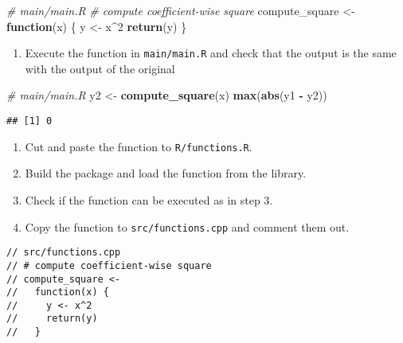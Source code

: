 \documentclass[
]{book}
\newenvironment{Shaded}{\begin{snugshade}}{\end{snugshade}}
\newcommand{\CommentTok}[1]{\textcolor[rgb]{0.56,0.35,0.01}{\textit{#1}}}
\newcommand{\ControlFlowTok}[1]{\textcolor[rgb]{0.13,0.29,0.53}{\textbf{#1}}}
\newcommand{\DecValTok}[1]{\textcolor[rgb]{0.00,0.00,0.81}{#1}}
\newcommand{\FunctionTok}[1]{\textcolor[rgb]{0.13,0.29,0.53}{\textbf{#1}}}
\newcommand{\NormalTok}[1]{#1}
\newcommand{\OtherTok}[1]{\textcolor[rgb]{0.56,0.35,0.01}{#1}}
\newcommand{\SpecialCharTok}[1]{\textcolor[rgb]{0.81,0.36,0.00}{\textbf{#1}}}
\providecommand{\tightlist}{%
  \setlength{\itemsep}{0pt}\setlength{\parskip}{0pt}}
\begin{document}
\begin{Shaded}
\begin{Highlighting}[]
\CommentTok{\# main/main.R}
\CommentTok{\# compute coefficient{-}wise square}
\NormalTok{compute\_square }\OtherTok{\textless{}{-}}
  \ControlFlowTok{function}\NormalTok{(x) \{}
\NormalTok{    y }\OtherTok{\textless{}{-}}\NormalTok{ x}\SpecialCharTok{\^{}}\DecValTok{2}
    \FunctionTok{return}\NormalTok{(y)}
\NormalTok{  \}}
\end{Highlighting}
\end{Shaded}

\begin{enumerate}
\def\labelenumi{\arabic{enumi}.}
\setcounter{enumi}{2}
\tightlist
\item
  Execute the function in \texttt{main/main.R} and check that the output is the same with the output of the original
\end{enumerate}

\begin{Shaded}
\begin{Highlighting}[]
\CommentTok{\# main/main.R}
\NormalTok{y2 }\OtherTok{\textless{}{-}} \FunctionTok{compute\_square}\NormalTok{(x)}
\FunctionTok{max}\NormalTok{(}\FunctionTok{abs}\NormalTok{(y1 }\SpecialCharTok{{-}}\NormalTok{ y2))}
\end{Highlighting}
\end{Shaded}

\begin{verbatim}
## [1] 0
\end{verbatim}

\begin{enumerate}
\def\labelenumi{\arabic{enumi}.}
\setcounter{enumi}{3}
\tightlist
\item
  Cut and paste the function to \texttt{R/functions.R}.
\item
  Build the package and load the function from the library.
\item
  Check if the function can be executed as in step 3.
\item
  Copy the function to \texttt{src/functions.cpp} and comment them out.
\end{enumerate}

\begin{verbatim}
// src/functions.cpp
// # compute coefficient-wise square
// compute_square <-
//   function(x) {
//     y <- x^2
//     return(y)
//   }
\end{verbatim}
\end{document}
